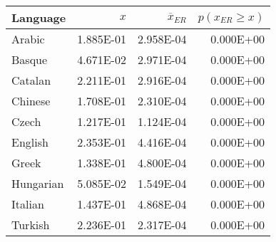 \begin{tabular}{lrrr}
\toprule
 Language   &       $x$ &   $\overline x_{ER}$ &  $p(x_{ER} \ge x)$   \\
\midrule
 Arabic     & \num{1.885E-01} &            \num{2.958E-04} &           \num{0.000E+00} \\
 Basque     & \num{4.671E-02} &            \num{2.971E-04} &           \num{0.000E+00} \\
 Catalan    & \num{2.211E-01} &            \num{2.916E-04} &           \num{0.000E+00} \\
 Chinese    & \num{1.708E-01} &            \num{2.310E-04} &           \num{0.000E+00} \\
 Czech      & \num{1.217E-01} &            \num{1.124E-04} &           \num{0.000E+00} \\
 English    & \num{2.353E-01} &            \num{4.416E-04} &           \num{0.000E+00} \\
 Greek      & \num{1.338E-01} &            \num{4.800E-04} &           \num{0.000E+00} \\
 Hungarian  & \num{5.085E-02} &            \num{1.549E-04} &           \num{0.000E+00} \\
 Italian    & \num{1.437E-01} &            \num{4.868E-04} &           \num{0.000E+00} \\
 Turkish    & \num{2.236E-01} &            \num{2.317E-04} &           \num{0.000E+00} \\
\bottomrule
\end{tabular}
